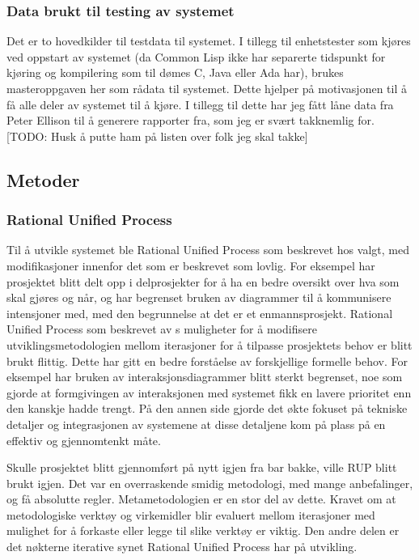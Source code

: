 \documentclass[11pt]{article}
\begin{document}
\subsubsection{Data brukt til testing av systemet}



Det er to hovedkilder til testdata til systemet. I tillegg til enhetstester som kjøres ved oppstart av systemet (da Common Lisp ikke har separerte tidspunkt for kjøring og kompilering som til dømes C, Java eller Ada har), brukes masteroppgaven her som rådata til systemet. Dette hjelper på motivasjonen til å få alle deler av systemet til å kjøre. I tillegg til dette har jeg fått låne data fra Peter Ellison til å generere rapporter fra, som jeg er svært takknemlig for. [TODO: Husk å putte ham på listen over folk jeg skal takke]



\subsection{Metoder}



\subsubsection{Rational Unified Process}



Til å utvikle systemet ble Rational Unified Process som beskrevet hos \cite{Larman2011} valgt, med modifikasjoner innenfor det som er beskrevet som lovlig. For eksempel har prosjektet blitt delt opp i delprosjekter for å ha en bedre oversikt over hva som skal gjøres og når, og har begrenset bruken av diagrammer til å kommunisere intensjoner med, med den begrunnelse at det er et enmannsprosjekt. Rational Unified Process som beskrevet av \cite{Larman2011}s muligheter for å modifisere utviklingsmetodologien mellom iterasjoner for å tilpasse prosjektets behov er blitt brukt flittig. Dette har gitt en bedre forståelse av forskjellige formelle behov. For eksempel har bruken av interaksjonsdiagrammer blitt sterkt begrenset, noe som gjorde at formgivingen av interaksjonen med systemet fikk en lavere prioritet enn den kanskje hadde trengt. På den annen side gjorde det økte fokuset på tekniske detaljer og integrasjonen av systemene at disse detaljene kom på plass på en effektiv og gjennomtenkt måte.



Skulle prosjektet blitt gjennomført på nytt igjen fra bar bakke, ville RUP blitt brukt igjen. Det var en overraskende smidig metodologi, med mange anbefalinger, og få absolutte regler. Metametodologien er en stor del av dette. Kravet om at metodologiske verktøy og virkemidler blir evaluert mellom iterasjoner med mulighet for å forkaste eller legge til slike verktøy er viktig. Den andre delen er det nøkterne iterative synet Rational Unified Process har på utvikling. 
\end{document}
